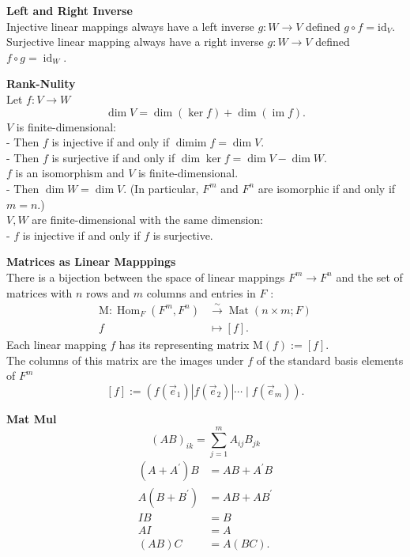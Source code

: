 \documentclass[a4paper, 10pt]{article}
\begin{document}
\begin{multicols*}{3}
\textbf{Left and Right Inverse}\\
Injective linear mappings always have a left inverse $g: W \rightarrow V$ defined $g \circ f=\mathrm{id}_V$.
Surjective linear mapping always have a right inverse $g: W \rightarrow V$ defined $f \circ g=\operatorname{id}_W$.

\textbf{Rank-Nulity}\\
Let $f: V \rightarrow W$ 
$$
\operatorname{dim} V=\operatorname{dim}(\operatorname{ker} f)+\operatorname{dim}(\operatorname{im} f) .
$$
$V$ is finite-dimensional:\\
- Then $f$ is injective if and only if $\operatorname{dim im} f=\operatorname{dim} V$. \\
- Then $f$ is surjective if and only if $\operatorname{dim} \operatorname{ker} f=\operatorname{dim} V-\operatorname{dim} W$.\\
$f$ is an isomorphism and $V$ is finite-dimensional. \\
- Then $\operatorname{dim} W=\operatorname{dim} V$. (In particular, $F^m$ and $F^n$ are isomorphic if and only if $m=n$.)\\
$V, W$ are finite-dimensional with the same dimension:\\
- $f$ is injective if and only if $f$ is surjective.

\textbf{Matrices as Linear Mapppings}\\
There is a bijection between the space of linear mappings $F^m \rightarrow F^n$ and the set of matrices with $n$ rows and $m$ columns and entries in $F$ :
\begin{align*}
\mathrm{M}: \operatorname{Hom}_F\left(F^m, F^n\right) & \stackrel{\sim}{\rightarrow} \operatorname{Mat}(n \times m ; F) \\
f & \mapsto[f] .
\end{align*}
Each linear mapping $f$ has its representing matrix $\mathrm{M}(f):=[f]$. \\
The columns of this matrix are the images under $f$ of the standard basis elements of $F^m$ 
$$
[f]:=\left(f\left(\vec{e}_1\right)\left|f\left(\vec{e}_2\right)\right| \cdots \mid f\left(\vec{e}_m\right)\right) .
$$

\textbf{Mat Mul}\\
$$
(A B)_{i k}=\sum_{j=1}^m A_{i j} B_{j k}
$$
\begin{align*}
\left(A+A^{\prime}\right) B & =A B+A^{\prime} B \\
A\left(B+B^{\prime}\right) & =A B+A B^{\prime} \\
I B & =B \\
A I & =A \\
(A B) C & =A(B C) .
\end{align*}


\end{multicols*}
\end{document}

